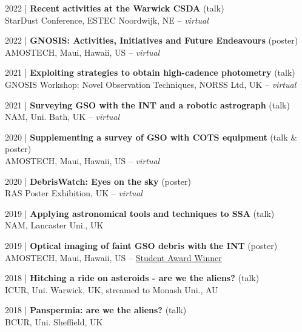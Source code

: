 \documentclass[10pt,a4paper]{altacv}
\begin{document}
\smallskip

\small 2022 | \textbf{Recent activities at the Warwick CSDA} (talk) \\
StarDust Conference, ESTEC Noordwijk, NE -- \textit{virtual}

\smallskip

\small 2022 | \textbf{GNOSIS: Activities, Initiatives and Future Endeavours} (poster) \\
AMOSTECH, Maui, Hawaii, US -- \textit{virtual}

\smallskip

\small 2021 | \textbf{Exploiting strategies to obtain high-cadence photometry} (talk) \\
GNOSIS Workshop: Novel Observation Techniques, NORSS Ltd, UK -- \textit{virtual}

\smallskip

\small 2021 | \textbf{Surveying GSO with the INT and a robotic astrograph} (talk) \\
NAM, Uni. Bath, UK -- \textit{virtual}

\smallskip

\small 2020 | \textbf{Supplementing a survey of GSO with COTS equipment} (talk \& poster) \\
AMOSTECH, Maui, Hawaii, US -- \textit{virtual}

\smallskip

\small 2020 | \textbf{DebrisWatch: Eyes on the sky} (poster) \\
RAS Poster Exhibition, UK -- \textit{virtual}

\smallskip

\small 2019 | \textbf{Applying astronomical tools and techniques to SSA} (talk) \\
NAM, Lancaster Uni., UK

\smallskip

\small 2019 | \textbf{Optical imaging of faint GSO debris with the INT} (poster) \\
AMOSTECH, Maui, Hawaii, US -- \href{https://amostech.com/2019-archive/}{Student Award Winner}

\smallskip

\small 2018 | \textbf{Hitching a ride on asteroids - are we the aliens?} (talk) \\
ICUR, Uni. Warwick, UK, streamed to Monash Uni., AU

\smallskip

\small 2018 | \textbf{Panspermia: are we the aliens?} (talk) \\
BCUR, Uni. Sheffield, UK
\end{document}
